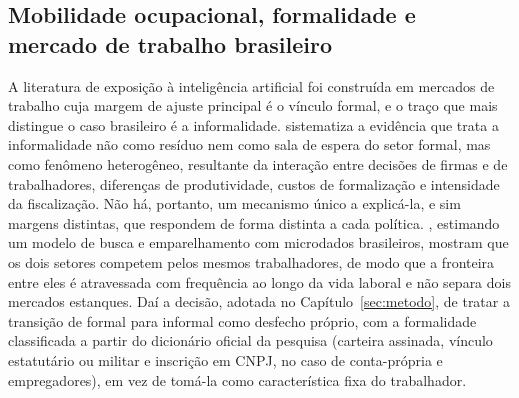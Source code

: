 \subsection{Mobilidade ocupacional, formalidade e mercado de trabalho brasileiro}

A literatura de exposição à inteligência artificial foi construída em mercados
de trabalho cuja margem de ajuste principal é o vínculo formal, e o traço que
mais distingue o caso brasileiro é a informalidade. 
sistematiza a evidência que trata a informalidade não como resíduo nem como sala
de espera do setor formal, mas como fenômeno heterogêneo, resultante da
interação entre decisões de firmas e de trabalhadores, diferenças de
produtividade, custos de formalização e intensidade da fiscalização. Não há,
portanto, um mecanismo único a explicá-la, e sim margens distintas, que
respondem de forma distinta a cada política. , estimando
um modelo de busca e emparelhamento com microdados brasileiros, mostram que os
dois setores competem pelos mesmos trabalhadores, de modo que a fronteira entre
eles é
atravessada com frequência ao longo da vida laboral e não separa dois mercados
estanques. Daí a decisão, adotada no Capítulo~\ref{sec:metodo}, de tratar a
transição de formal para informal como desfecho próprio, com a formalidade
classificada a partir do dicionário oficial da pesquisa (carteira assinada,
vínculo estatutário ou militar e inscrição em CNPJ, no caso de conta-própria e
empregadores), em vez de tomá-la como característica fixa do trabalhador.

